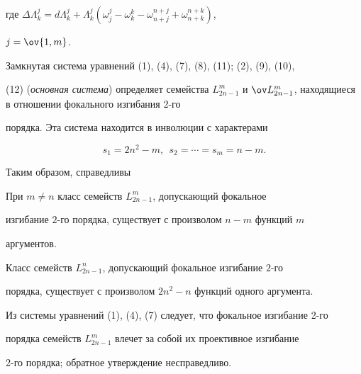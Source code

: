 где $\Delta\Lambda^j_k= d\Lambda^j_k+\Lambda^j_k 


(\omega^j_j-\omega^k_k- \omega^{n+j}_{n+j}+\omega^{n+k}_{n+k})$, 


$j=\ov{1,m}$. 


 


Замкнутая система уравнений (1), (4), (7), (8), (11); (2), (9), (10), 


(12) ({\it основная система}) определяет семейства $L^m_{2n-1}$ и $\ov 


L{}^m_{2n-1}$, находящиеся в отношении фокального изгибания 2-го 


порядка. Эта система находится в инволюции с характерами 


\begin{equation} 


s_1=2n^2-m,\ \ s_2=\dotsb=s_m=n-m. 


\end{equation} 


 


Таким образом, справедливы 


 


\begin{thm} 


При $m\ne n$ класс семейств $L^m_{2n-1}$, допускающий фокальное 


изгибание $2$-го порядка, существует с произволом $n-m$ функций $m$ 


аргументов. 


\end{thm} 


 


\begin{thm} 


Класс семейств $L^n_{2n-1}$, допускающий фокальное изгибание $2$-го 


порядка, существует с произволом $2n^2-n$ функций одного аргумента. 


\end{thm} 


 


Из системы уравнений (1), (4), (7) следует, что фокальное изгибание 2-го 


порядка семейств $L^m_{2n-1}$ влечет за собой их проективное изгибание 


2-го порядка; обратное утверждение несправедливо. 


